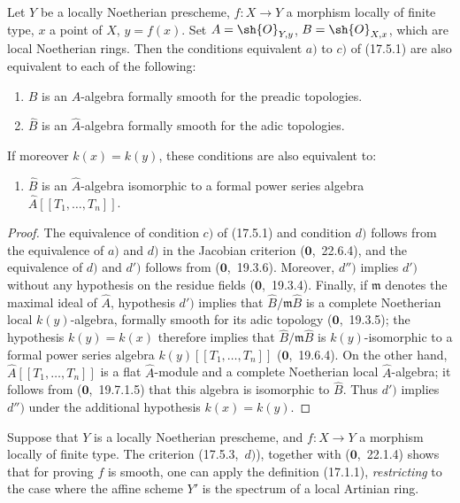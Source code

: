\begin{proposition}[17.5.3]
\label{IV.17.5.3}
Let $Y$ be a locally Noetherian prescheme, $f:X\to Y$ a morphism locally of finite type, $x$ a point of $X$, $y=f(x)$.
Set $A=\sh{O}_{Y,y}$, $B=\sh{O}_{X,x}$, which are local Noetherian rings.
Then the conditions equivalent $a)$ to $c)$ of (17.5.1) are also equivalent to each of the following:


\begin{enumerate}
  \item[d)] $B$ is an $A$-algebra formally smooth for the preadic topologies.
  \item[d')] $\hat{B}$ is an $\hat{A}$-algebra formally smooth for the adic topologies.
\end{enumerate}
If moreover $k(x)=k(y)$, these conditions are also equivalent to:
\begin{enumerate}
  \item[d'')] $\hat{B}$ is an $\hat{A}$-algebra isomorphic to a formal power series algebra $\hat{A}[[T_1,\ldots,T_n]]$.
\end{enumerate}
\end{proposition}

\begin{proof}
The equivalence of condition $c)$ of (17.5.1) and condition $d)$ follows from the equivalence of $a)$ and $d)$ in the Jacobian criterion ($\mathbf{0}$,~22.6.4), and the equivalence of $d)$ and $d')$ follows from ($\mathbf{0}$,~19.3.6).
Moreover, $d'')$ implies $d')$ without any hypothesis on the residue fields ($\mathbf{0}$,~19.3.4).
Finally, if $\mathfrak{m}$ denotes the maximal ideal of $\hat{A}$, hypothesis $d')$ implies that $\hat{B}/\mathfrak{m}\hat{B}$ is a complete Noetherian local $k(y)$-algebra, formally smooth for its adic topology ($\mathbf{0}$,~19.3.5); the hypothesis $k(y)=k(x)$ therefore implies that $\hat{B}/\mathfrak{m}\hat{B}$ is $k(y)$-isomorphic to a formal power series algebra $k(y)[[T_1,\ldots,T_n]]$ ($\mathbf{0}$,~19.6.4).
On the other hand, $\hat{A}[[T_1,\ldots,T_n]]$ is a flat $\hat{A}$-module and a complete Noetherian local $\hat{A}$-algebra; it follows from ($\mathbf{0}$,~19.7.1.5) that this algebra is isomorphic to $\hat{B}$.
Thus $d')$ implies $d'')$ under the additional hypothesis $k(x)=k(y)$.
\end{proof}

\begin{remark}[17.5.4]
\label{IV.17.5.4}
Suppose that $Y$ is a locally Noetherian prescheme, and $f:X\to Y$ a morphism locally of finite type.
The criterion (17.5.3,~$d)$), together with ($\mathbf{0}$,~22.1.4) shows that for proving $f$ is smooth, one can apply the definition (17.1.1), \emph{restricting} to the case where the affine scheme $Y'$ is the spectrum of a local Artinian ring.
\end{remark}

